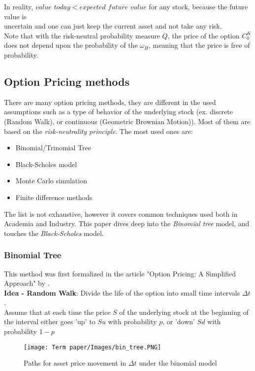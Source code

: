 \documentclass[11pt]{article}
\begin{document}
In reality, $value$ $today < expected$ $future$ $value$ for any stock, because the future value is\\ uncertain and one can just keep the current asset and not take any risk.\\
Note that with the risk-neutral probability measure $Q$, the price of the option $C_0^K$ does not depend upon the probability of the $\omega_H$, meaning that the price is free of probability. 

\newpage
\subsection{Option Pricing methods}
There are many option pricing methods, they are different in the used assumptions such as a type of behavior of the underlying stock (ex. discrete (Random Walk), or continuous (Geometric Brownian Motion)). Most of them are based on the \textit{risk-neutrality principle}. The most used ones are:
\begin{itemize}
    \item Binomial/Trinomial Tree
    \item Black-Scholes model
    \item Monte Carlo simulation
    \item Finite difference methods
\end{itemize}
The list is not exhaustive, however it covers common techniques used both in Academia and Industry. This paper dives deep into the \textit{Binomial tree} model, and touches the \textit{Black-Scholes} model.

\subsubsection{Binomial Tree}
\label{bintree}
This method was first formalized in the article "Option Pricing: A Simplified Approach" by \cite{C_R_R_79}.\\
\textbf{Idea - Random Walk}: Divide the life of the option into small time intervals $\Delta{t}$.\\
Assume that at each time the price $S$ of the underlying stock at the beginning of the interval either goes 'up' to $Su$ with probability $p$, or 'down' $Sd$ with probability $1-p$\\ 

\begin{figure}[H]
  \centering
  \texttt{[image: Term paper/Images/bin\_tree.PNG]}
  \caption{Paths for asset price movement in $\Delta{t}$ under the binomial model \protect\cite{Hull_9}}
  \label{fig:bin_tree}
\end{figure}
\end{document}
